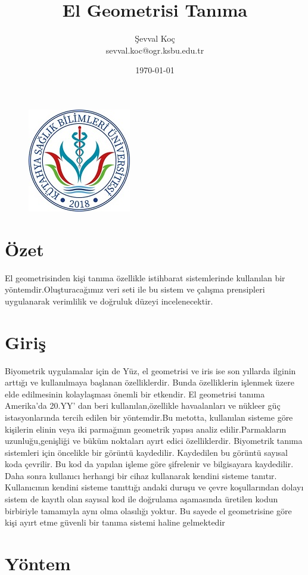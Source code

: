 \documentclass[12pt, a4paper]{article}
\title{El Geometrisi Tanıma}
\author{Şevval Koç \\ {sevval.koc@ogr.ksbu.edu.tr}}
\date{\today}
\begin{document}
	\begin{figure}[]
		\centering
		\includegraphics{ksbu.jpeg}
	\end{figure}
	\maketitle
	\section{Özet}
El geometrisinden kişi tanıma özellikle istihbarat sistemlerinde kullanılan bir yöntemdir.Oluşturacağımız veri seti ile bu sistem ve çalışma prensipleri uygulanarak verimlilik ve doğruluk düzeyi incelenecektir. 

\section{Giriş}
Biyometrik uygulamalar için de
Yüz, el geometrisi ve iris ise son yıllarda ilginin arttığı ve
kullanılmaya başlanan özelliklerdir. Bunda özelliklerin
işlenmek üzere elde edilmesinin kolaylaşması önemli bir
etkendir.
El geometrisi tanıma Amerika’da 20.YY' dan beri kullanılan,özellikle havaalanları ve nükleer güç istasyonlarında tercih edilen bir yöntemdir.Bu metotta, kullanılan sisteme göre kişilerin elinin veya iki parmağının geometrik yapısı analiz edilir.Parmakların uzunluğu,genişliği ve büküm noktaları ayırt edici özelliklerdir.
Biyometrik tanıma sistemleri için öncelikle bir görüntü
kaydedilir. Kaydedilen bu görüntü sayısal koda çevrilir. Bu
kod da yapılan işleme göre şifrelenir ve bilgisayara kaydedilir.
Daha sonra kullanıcı herhangi bir cihaz kullanarak kendini
sisteme tanıtır. Kullanıcının kendini sisteme tanıttığı andaki
duruşu ve çevre koşullarından dolayı sistem de kayıtlı olan
sayısal kod ile doğrulama aşamasında üretilen kodun birbiriyle
tamamıyla aynı olma olasılığı yoktur. Bu sayede el geometrisine göre kişi ayırt etme güvenli bir tanıma sistemi haline gelmektedir 
\section{Yöntem}
\end{document}
